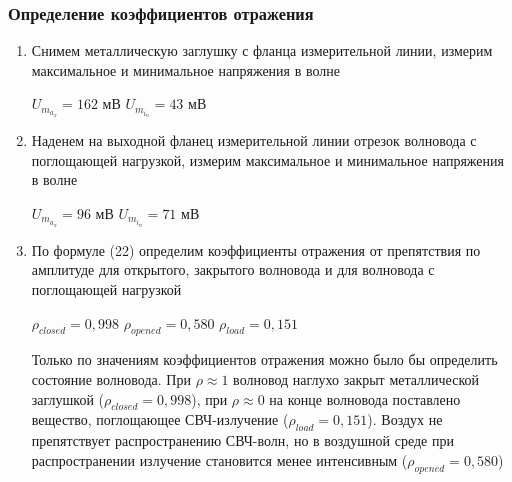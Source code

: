 \documentclass[a4paper]{article}
\begin{document}
\subsubsection{Определение коэффициентов отражения}
\begin{enumerate}
    \item Снимем металлическую заглушку с фланца измерительной линии, измерим максимальное и минимальное напряжения в волне
    \begin{center}
        $U_m_a_x = 162$ мВ \hspace{2cm} $U_m_i_n = 43$ мВ
    \end{center}
    
    \item Наденем на выходной фланец измерительной линии отрезок волновода с поглощающей нагрузкой, измерим максимальное и минимальное напряжения в волне
    \begin{center}
        $U_m_a_x = 96$ мВ \hspace{2cm} $U_m_i_n = 71$ мВ
    \end{center}
    
    \item По формуле (22) определим коэффициенты отражения от препятствия по амплитуде для открытого, закрытого волновода и для волновода с поглощающей нагрузкой
    \begin{center}
        $\rho_{closed} = 0,998$ \hspace{1cm} $\rho_{opened} = 0,580$ \hspace{1cm} $\rho_{load} = 0,151$
    \end{center}
    
    Только по значениям коэффициентов отражения можно было бы определить состояние волновода. При $\rho \approx 1$ волновод наглухо закрыт металлической заглушкой ($\rho_{closed} = 0,998$), при $\rho \approx 0$ на конце волновода поставлено вещество, поглощающее СВЧ-излучение ($\rho_{load} = 0,151$). Воздух не препятствует распространению СВЧ-волн, но в воздушной среде при распространении излучение становится менее интенсивным ($\rho_{opened} = 0,580$)
    
\end{enumerate}
\end{document}
